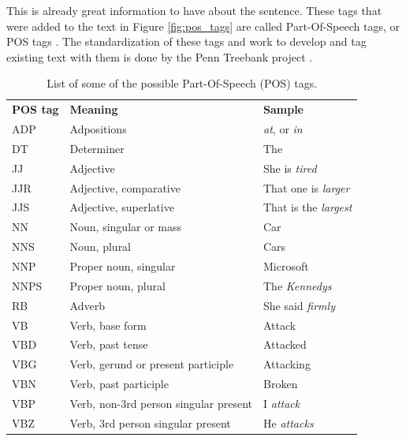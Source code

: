 \documentclass[11pt,a4paper,openright]{memoir}
\begin{document}
This is already great information to have about the sentence. These tags that were added to the text in Figure \ref{fig:pos_tags} are called Part-Of-Speech tags, or POS tags \cite{Jurafsky:2000:SLP:555733}. The standardization of these tags and work to develop and tag existing text with them is done by the Penn Treebank project \cite{Marcus:1993:BLA:972470.972475}.

\begin{table}[!htbp]
  \centering
    \begin{tabular}{lll}
      \textbf{POS tag}     & \textbf{Meaning}      & \textbf{Sample} \\
      ADP  & Adpositions                           & \emph{at}, or \emph{in}        \\  
      DT   & Determiner                            & The                     \\
      JJ   & Adjective                             & She is \emph{tired}     \\
      JJR  & Adjective, comparative                & That one is \emph{larger} \\
      JJS  & Adjective, superlative                & That is the \emph{largest}     \\
      NN   & Noun, singular or mass                & Car                     \\
      NNS  & Noun, plural                          & Cars                    \\
      NNP  & Proper noun, singular                 & Microsoft               \\
      NNPS & Proper noun, plural                   & The \emph{Kennedys}            \\
      RB   & Adverb                                & She said \emph{firmly}         \\
      VB   & Verb, base form                       & Attack                  \\
      VBD  & Verb, past tense                      & Attacked                \\
      VBG  & Verb, gerund or present participle    & Attacking               \\
      VBN  & Verb, past participle                 & Broken                  \\
      VBP  & Verb, non-3rd person singular present & I \emph{attack}                \\
      VBZ  & Verb, 3rd person singular present     & He \emph{attacks}               
    \end{tabular}
  \caption[List of some of the possible Part-Of-Speech (POS) tags.]{List of some of the possible Part-Of-Speech (POS) tags.}
  \label{tab:pos_tags_list}
\end{table}
\end{document}
